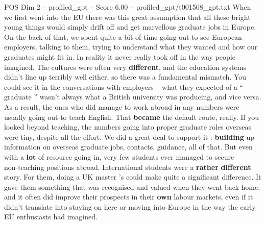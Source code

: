 \begin{textsample}{POS Dim 2 – profiled\_gpt – Score 6.00 – profiled\_gpt/t001508\_gpt.txt}  \label{ex:f2_pos_020}
When we first went into the EU there was this great assumption that all these bright young things would simply drift off and get marvellous graduate jobs in Europe.
On the back of that, we spent quite a bit of time going out to see European employers, talking to them, trying to understand what they wanted and how our graduates might fit in.
In reality it never really took off in the way people imagined.
The cultures were often very \textbf{different}, and the education systems didn't line up terribly well either, so there was a fundamental mismatch.
You could see it in the conversations with employers – what they expected of a “ graduate ” wasn't always what a British university was producing, and vice versa.
As a result, the ones who did manage to work abroad in any numbers were usually going out to teach English.
That \textbf{became} the default route, really.
If you looked beyond teaching, the numbers going into proper graduate roles overseas were tiny, despite all the effort.
We did a great deal to support it : \textbf{building} up information on overseas graduate jobs, contacts, guidance, all of that.
But even with a \textbf{lot} of resource going in, very few students ever managed to secure non‑teaching positions abroad.
International students were a \textbf{rather} \textbf{different} story.
For them, doing a UK master ’s could make quite a significant difference.
It gave them something that was recognised and valued when they went back home, and it often did improve their prospects in their \textbf{own} labour markets, even if it didn't translate into staying on here or moving into Europe in the way the early EU enthusiasts had imagined.

\end{textsample}

